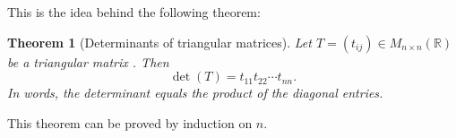 \documentclass[10pt]{article}
\newtheorem{theorem}{Theorem}
\theoremstyle{definition}
\newcommand{\Fl}[1]{\vspace{5mm}\noindent\textbf{#1}}%
\newcommand{\R}{\mathbb{R}}           %
\begin{document}
This is the idea behind the following theorem:

\begin{theorem}[Determinants of triangular matrices]
  \label{thm:determinants-triangular-matrices}
  Let $T=(t_{ij})\in M_{n\times n}(\R)$ be a triangular matrix . Then
  \begin{equation*}
    \det(T) = t_{11}t_{22}\cdots t_{nn}.
  \end{equation*}
  In words, the determinant equals the product of the diagonal entries.
\end{theorem}

This theorem can be proved by induction on $n$.
  





  
\end{document}
